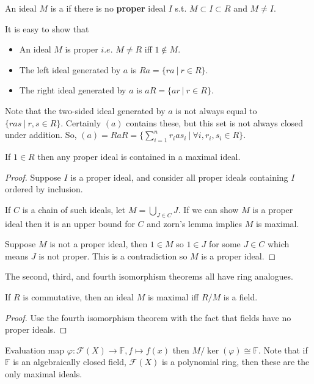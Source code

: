 \documentclass[a4paper]{article}
\begin{document}
\begin{definition}
    An ideal $M$ is a  if there is no \textbf{proper} ideal $I$ s.t. $M\subset I\subset R$ and $M\neq I.$
\end{definition}
It is easy to show that \begin{itemize}
    \item An ideal $M$ is proper $i.e.$ $M\neq R$ iff $1\notin M.$
    \item The left ideal generated by $a$ is $Ra=\{ra~|~r\in R\}.$
    \item The right ideal generated by $a$ is $aR=\{ar~|~r\in R\}.$
\end{itemize}
Note that the two-sided ideal generated by $a$ is not always equal to $\{ras~|~r,s\in R\}.$ Certainly $(a)$ contains these, but this set is not always closed under addition. So, $(a)=RaR=\{\sum_{i=1}^n r_ias_i~|~\forall i,r_i,s_i\in R\}.$
\begin{proposition}
    If $1\in R$ then any proper ideal is contained in a maximal ideal.
    \begin{proof}
        Suppose $I$ is a proper ideal, and consider all proper ideals containing $I$ ordered by inclusion.

        If $C$ is a chain of such ideals, let $M=\bigcup_{J\in C}J.$ If we can show $M$ is a proper ideal then it is an upper bound for $C$ and zorn's lemma implies $M$ is maximal.

        Suppose $M$ is not a proper ideal, then $1\in M$ so $1\in J$ for some $J\in C$ which means $J$ is not proper. This is a contradiction so $M$ is a proper ideal.
    \end{proof}
\end{proposition}
The second, third, and fourth isomorphism theorems all have ring analogues.
\begin{proposition}
    If $R$ is commutative, then an ideal $M$ is maximal iff $R/M$ is a field.
    \begin{proof}
        Use the fourth isomorphism theorem with the fact that fields have no proper ideals.
    \end{proof}
\end{proposition}
\begin{example}
    Evaluation map $\varphi:\mathcal{F}(X)\to\mathbb F,f\mapsto f(x)$ then $M/\ker(\varphi)\cong\mathbb F.$ Note that if $\mathbb F$ is an algebraically closed field, $\mathcal{F}(X)$ is a polynomial ring, then these are the only maximal ideals.
\end{example}
\end{document}
